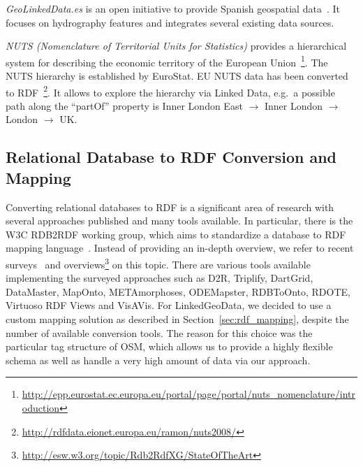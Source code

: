\begin{description}
\item \emph{GeoLinkedData.es} is an open initiative to provide Spanish geospatial data~\cite{geolinkeddata}. 
It focuses on hydrography features and integrates several existing data sources.
\item \emph{NUTS (Nomenclature of Territorial Units for Statistics)} provides a hierarchical system for describing the economic territory of the European Union~\footnote{\url{http://epp.eurostat.ec.europa.eu/portal/page/portal/nuts_nomenclature/introduction}}. 
The NUTS hierarchy is established by EuroStat. EU NUTS data has been converted to RDF~\footnote{\url{http://rdfdata.eionet.europa.eu/ramon/nuts2008/}}. 
It allows to explore the hierarchy via Linked Data, e.g.~a possible path along the ``partOf'' property is  Inner London East $\to$ Inner London $\to$ London $\to$ UK.
\end{description}

\subsection{Relational Database to RDF Conversion and Mapping}

Converting relational databases to RDF is a significant area of research with several approaches published and many tools available. 
In particular, there is the W3C RDB2RDF working group, which aims to standardize a database to RDF mapping language~\cite{r2rml}. 
Instead of providing an in-depth overview, we refer to recent surveys~\cite{RDB2RDF,SWJ_RDB2RDF}  and overviews\footnote{\url{http://esw.w3.org/topic/Rdb2RdfXG/StateOfTheArt}} on this topic.
There are various tools available implementing the surveyed approaches such as D2R, Triplify, DartGrid, DataMaster, MapOnto, METAmorphoses, ODEMapster, RDBToOnto, RDOTE, Virtuoso RDF Views and VisAVis. 
For LinkedGeoData, we decided to use a custom mapping solution as described in Section~\ref{sec:rdf_mapping}, despite the number of available conversion tools. 
The reason for this choice was the particular tag structure of OSM, which allows us to provide a highly flexible schema as well as handle a very high amount of data via our approach.



